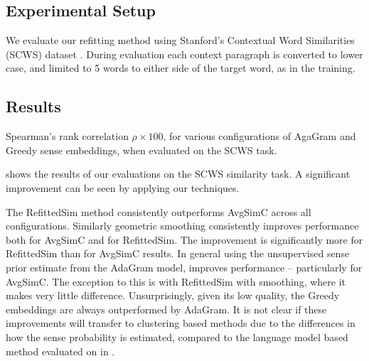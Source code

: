 \documentclass{article} %
\def\parencite{\cite} %
\begin{document}
\subsection{Experimental Setup}
We evaluate our refitting method using Stanford's Contextual Word Similarities (SCWS) dataset \parencite{Huang2012}.
During evaluation each context paragraph is converted to lower case, and limited to 5 words to either side of the target word, as in the training.


\subsection{Results}

\begin{table}
	\begin{adjustbox}{max width=\columnwidth}
	\end{adjustbox}

\caption{Spearman's rank correlation $\rho \times 100$, for various configurations of AgaGram and Greedy sense embeddings, when evaluated on the SCWS task.} \label{swscres}
\end{table}

 shows the results of our evaluations on the SCWS similarity task. A significant improvement can be seen by applying our techniques.

The RefittedSim method consistently outperforms AvgSimC across all configurations.
Similarly geometric smoothing consistently improves performance both for AvgSimC and for RefittedSim. The improvement is significantly more for RefittedSim than for AvgSimC results.
In general using the unsupervised sense prior estimate from the AdaGram model, improves performance -- particularly for AvgSimC. The exception to this is with RefittedSim with smoothing, where it makes very little difference.
Unsurprisingly, given its low quality, the Greedy embeddings are always outperformed by AdaGram.
It is not clear if these improvements will transfer to clustering based methods due to the differences in how the sense probability is estimated, compared to the language model based method evaluated on in .
\end{document}
